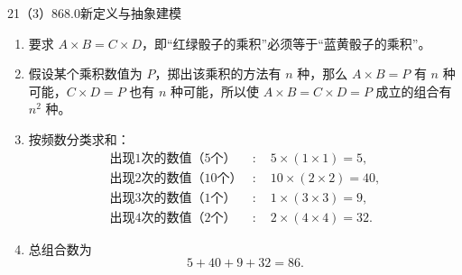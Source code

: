 \begin{solution}{21（3）}{86}{8.0}{新定义与抽象建模}
\begin{enumerate}[label=\textbf{Step \arabic*:},leftmargin=*]
  \item 要求 \(A\times B=C\times D\)，即“红绿骰子的乘积”必须等于“蓝黄骰子的乘积”。
  \item 假设某个乘积数值为 \(P\)，掷出该乘积的方法有 \(n\) 种，那么 \(A\times B=P\) 有 \(n\) 种可能，\(C\times D=P\) 也有 \(n\) 种可能，所以使 \(A\times B=C\times D=P\) 成立的组合有 \(n^2\) 种。
  \item 按频数分类求和：
  \[
  \begin{aligned}
    \text{出现1次的数值（5个）}&:\quad 5\times(1\times1)=5,\\
    \text{出现2次的数值（10个）}&:\quad 10\times(2\times2)=40,\\
    \text{出现3次的数值（1个）}&:\quad 1\times(3\times3)=9,\\
    \text{出现4次的数值（2个）}&:\quad 2\times(4\times4)=32.
  \end{aligned}
  \]
  \item 总组合数为
  \[
    5+40+9+32=86.
  \]
\end{enumerate}
\end{solution}

